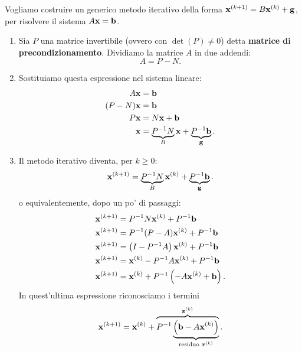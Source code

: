 Vogliamo costruire un generico metodo iterativo della forma $\mathbf{x}^{( k+1)} =B\mathbf{x}^{(k)} +\mathbf{g}$, per risolvere il sistema $A\mathbf{x} =\mathbf{b}$.
\begin{enumerate}
\item Sia $P$ una matrice invertibile (ovvero con $\det(P) \neq 0$) detta \textbf{matrice di precondizionamento}.
Dividiamo la matrice $A$ in due addendi:
\begin{equation*}
A=P-N.
\end{equation*}
\item Sostituiamo questa espressione nel sistema lineare:
\begin{align*}
A\mathbf{x} & =\mathbf{b}\\
( P-N)\mathbf{x} & =\mathbf{b}\\
P\mathbf{x} & =N\mathbf{x} +\mathbf{b}\\
\mathbf{x} & =\underbrace{P^{-1} N}_{B}\mathbf{x} +\underbrace{P^{-1}\mathbf{b}}_{\mathbf{g}}.
\end{align*}
\item Il metodo iterativo diventa, per $k\geqslant 0$:
\begin{equation}
\mathbf{x}^{( k+1)} =\underbrace{P^{-1} N}_{B}\mathbf{x}^{(k)} +\underbrace{P^{-1}\mathbf{b}}_{\mathbf{g}}.
\label{eq:forma-A-metodi-iterativi}
\end{equation}
o equivalentemente, dopo un po' di passaggi:
\begin{align*}
\mathbf{x}^{( k+1)} & =P^{-1} N\mathbf{x}^{(k)} +P^{-1}\mathbf{b}\\
\mathbf{x}^{( k+1)} & =P^{-1}( P-A)\mathbf{x}^{(k)} +P^{-1}\mathbf{b}\\
\mathbf{x}^{( k+1)} & =\left( I-P^{-1} A\right)\mathbf{x}^{(k)} +P^{-1}\mathbf{b}\\
\mathbf{x}^{( k+1)} & =\mathbf{x}^{(k)} -P^{-1} A\mathbf{x}^{(k)} +P^{-1}\mathbf{b}\\
\mathbf{x}^{( k+1)} & =\mathbf{x}^{(k)} +P^{-1}\left( -A\mathbf{x}^{(k)} +\mathbf{b}\right).
\end{align*}
In quest'ultima espressione riconosciamo i termini
\begin{equation}
	\x^{( k+1)} =\x^{(k)} +\overbrace{P^{-1}\underbrace{\left(\mathbf{b} -A\x^{(k)}\right)}_{\text{residuo} \ \mathbf{r}^{(k)}}}^{\mathbf{z}^{(k)}}.
	\label{eq:forma-B-metodi-iterativi}
\end{equation}
\end{enumerate}

